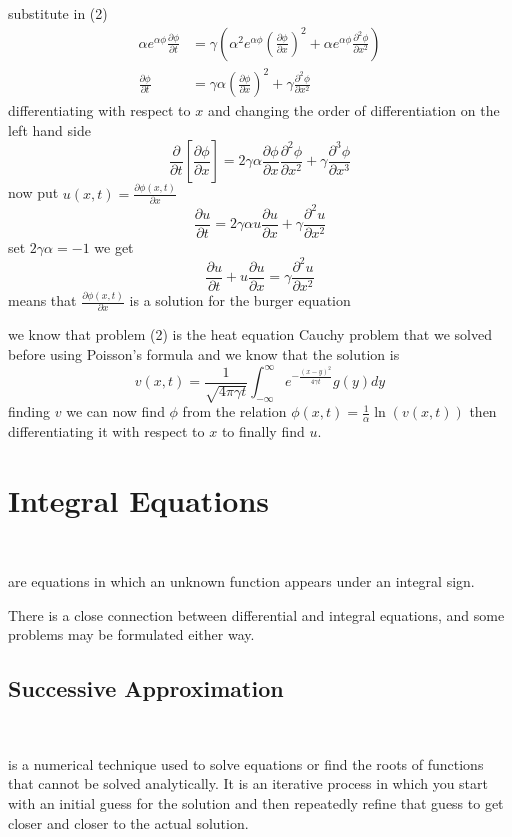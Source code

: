 \documentclass[]{article}
\begin{document}
substitute in (2)
\begin{align}
\alpha e^{\alpha\phi} \frac{\partial \phi}{\partial t} &= \gamma\left(\alpha^2 e^{\alpha \phi} {\left(\frac{\partial \phi}{\partial x}\right)}^2 + \alpha e^{\alpha\phi} \frac{\partial^2 \phi}{\partial x^2}\right)\nonumber
\\
\frac{\partial \phi}{\partial t} &= \gamma\alpha {\left(\frac{\partial \phi}{\partial x}\right)}^2 + \gamma \frac{\partial^2 \phi}{\partial x^2}
\end{align}
differentiating with respect to $x$ and changing the order of differentiation on the left hand side
\[
    \frac{\partial }{\partial t}\left[ \frac{\partial \phi}{\partial x}\right] = 2\gamma\alpha \frac{\partial\phi}{\partial x}\frac{\partial^2 \phi }{\partial x^2} + \gamma\frac{\partial^3 \phi}{\partial x^3}    
\]
now put $\displaystyle u(x,t) = \frac{\partial \phi(x,t)}{\partial x}$
\[
    \frac{\partial u }{\partial t} = 2\gamma\alpha u\frac{\partial u}{\partial x} + \gamma\frac{\partial^2 u}{\partial x^2}    
\]
set $2\gamma\alpha = -1$ we get
\[
    \frac{\partial u }{\partial t} + u\frac{\partial u}{\partial x} = \gamma\frac{\partial^2 u}{\partial x^2}    
\]
means that $\displaystyle \frac{\partial \phi(x,t)}{\partial x}$ is a solution for the burger equation 

we know that problem (2) is the heat equation Cauchy problem that we solved before using Poisson's formula and we know that the solution is 
\[
v(x,t) = \frac{1}{\sqrt{4\pi \gamma t}} \int_{-\infty}^{\infty} e^{-\frac{(x-y)^2}{4\gamma t}} g(y)dy    
\]
finding $v$ we can now find $\phi$ from the relation $\displaystyle \phi(x,t) = \frac{1}{\alpha}\ln(v(x,t))$ then differentiating it with respect to $x$ to finally find $u$.

\section{Integral Equations}
\
\begin{definition}
    are equations in which an unknown function appears under an integral sign.
\end{definition}
There is a close connection between differential and integral equations, and some problems may be formulated either way.

\subsection{Successive Approximation}
\
\begin{definition}
    is a numerical technique used to solve equations or find the roots of functions that cannot be solved analytically. It is an iterative process in which you start with an initial guess for the solution and then repeatedly refine that guess to get closer and closer to the actual solution.
\end{definition}
\end{document}
